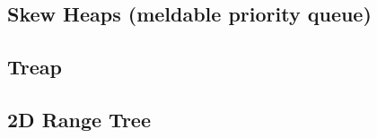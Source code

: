 %


%

\subsection{Skew Heaps (meldable priority queue)}


\subsection{Treap}


\subsection{2D Range Tree}

